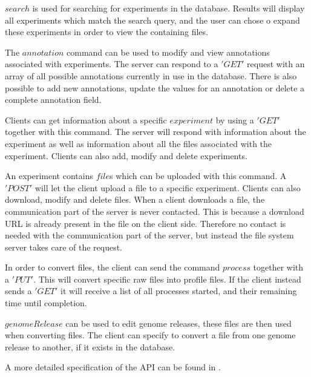 $search$ is used for searching for experiments in the database. Results will display all experiments which match the search query, and the user can chose o expand these experiments in order to view the containing files.

The $annotation$ command can be used to modify and view annotations associated with experiments. The server can respond to a $'GET'$ request with an array of all possible annotations currently in use in the database. There is also possible to add new annotations, update the values for an annotation or delete a complete annotation field.

Clients can get information about a specific $experiment$ by using a $'GET'$ together with this command. The server will respond with information about the experiment as well as information about all the files associated with the experiment. Clients can also add, modify and delete experiments.

An experiment contains $file$s which can be uploaded with this command. A $'POST'$ will let the client upload a file to a specific experiment. Clients can also download, modify and delete files. When a client downloads a file, the communication part of the server is never contacted. This is because a download URL is already present in the file on the client side. Therefore no contact is needed with the communication part of the server, but instead the file system server takes care of the request.

In order to convert files, the client can send the command $process$ together with a $'PUT'$. This will convert specific raw files into profile files. If the client instead sends a $'GET'$ it will receive a list of all processes started, and their remaining time until completion.

$genomeRelease$ can be used to edit genome releases, these files are then used when converting files. The client can specify to convert a file from one genome release to another, if it exists in the database.

A more detailed specification of the API can be found in .
